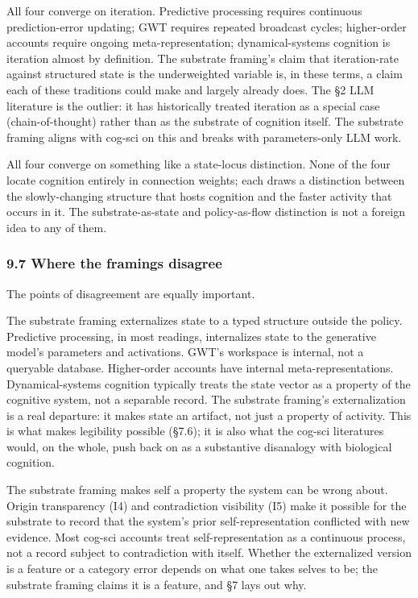 \documentclass[11pt,letterpaper]{article}
\begin{document}
All four converge on iteration. Predictive processing requires continuous prediction-error updating; GWT requires repeated broadcast cycles; higher-order accounts require ongoing meta-representation; dynamical-systems cognition is iteration almost by definition. The substrate framing's claim that iteration-rate against structured state is the underweighted variable is, in these terms, a claim each of these traditions could make and largely already does. The §2 LLM literature is the outlier: it has historically treated iteration as a special case (chain-of-thought) rather than as the substrate of cognition itself. The substrate framing aligns with cog-sci on this and breaks with parameters-only LLM work.

All four converge on something like a state-locus distinction. None of the four locate cognition entirely in connection weights; each draws a distinction between the slowly-changing structure that hosts cognition and the faster activity that occurs in it. The substrate-as-state and policy-as-flow distinction is not a foreign idea to any of them.

\subsubsection*{9.7 Where the framings disagree}

The points of disagreement are equally important.

The substrate framing externalizes state to a typed structure outside the policy. Predictive processing, in most readings, internalizes state to the generative model's parameters and activations. GWT's workspace is internal, not a queryable database. Higher-order accounts have internal meta-representations. Dynamical-systems cognition typically treats the state vector as a property of the cognitive system, not a separable record. The substrate framing's externalization is a real departure: it makes state an artifact, not just a property of activity. This is what makes legibility possible (§7.6); it is also what the cog-sci literatures would, on the whole, push back on as a substantive disanalogy with biological cognition.

The substrate framing makes self a property the system can be wrong about. Origin transparency (I4) and contradiction visibility (I5) make it possible for the substrate to record that the system's prior self-representation conflicted with new evidence. Most cog-sci accounts treat self-representation as a continuous process, not a record subject to contradiction with itself. Whether the externalized version is a feature or a category error depends on what one takes selves to be; the substrate framing claims it is a feature, and §7 lays out why.
\end{document}
